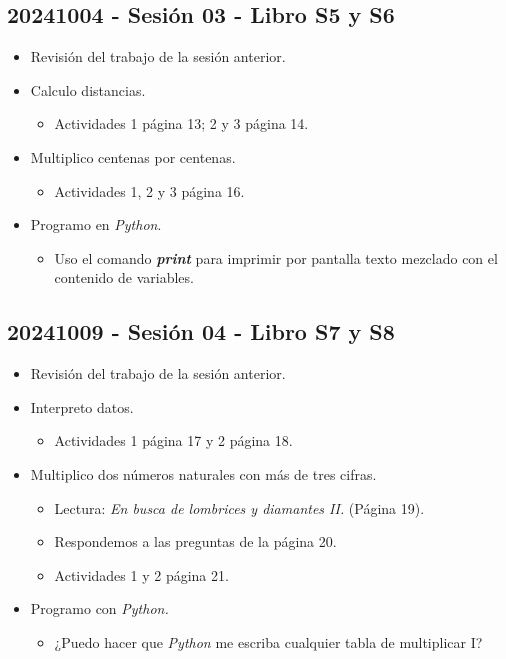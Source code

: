\documentclass[a4paper,12pt]{article}
\begin{document}
\subsection{20241004 - Sesión 03 - Libro S5 y S6}

\begin{itemize}
    \item Revisión del trabajo de la sesión anterior.
    \item Calculo distancias.
    \begin{itemize}
        \item Actividades 1 página 13; 2 y 3 página 14.
    \end{itemize}
    \item Multiplico centenas por centenas.
    \begin{itemize}
        \item Actividades 1, 2 y 3 página 16.
    \end{itemize}
    \item Programo en \textit{Python}.
    \begin{itemize}
        \item Uso el comando \textbf{\textit{print}} para imprimir por pantalla texto mezclado con el contenido de variables.
    \end{itemize}
\end{itemize}

\subsection{20241009 - Sesión 04 - Libro S7 y S8}

\begin{itemize}
    \item Revisión del trabajo de la sesión anterior.
    \item Interpreto datos.
    \begin{itemize}
        \item Actividades 1 página 17 y 2 página 18.
    \end{itemize}
    \item Multiplico dos números naturales con más de tres cifras.
    \begin{itemize}
        \item Lectura: \textit{En busca de lombrices y diamantes II.} (Página 19).
        \item Respondemos a las preguntas de la página 20.
        \item Actividades 1 y 2 página 21.
    \end{itemize}
    \item Programo con \textit{Python.}
    \begin{itemize}
        \item ¿Puedo hacer que \textit{Python} me escriba cualquier tabla de multiplicar I?
    \end{itemize}
\end{itemize}
\end{document}
